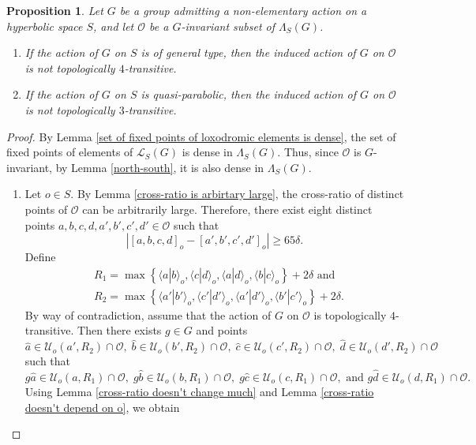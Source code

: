 \documentclass[11pt,letterpaper]{article}
\renewcommand{\l}{\langle}
\renewcommand{\r}{\rangle}
\newtheorem{prop}[thm]{Proposition}
\theoremstyle{definition}
\theoremstyle{remark}
\begin{document}
\begin{prop}\label{not 4-transitivity}
 Let $G$ be a group admitting a non-elementary action on a hyperbolic space $S$, and let $\mathcal{O}$ be a $G$-invariant subset of $\Lambda_S(G)$.
\begin{enumerate}
    \item[(a)] If the action of $G$ on $S$ is of general type, then the induced action of $G$ on $\mathcal{O}$ is not topologically $4$-transitive.
    \item[(b)] If the action of $G$ on $S$ is quasi-parabolic, then the induced action of $G$ on $\mathcal{O}$ is not topologically $3$-transitive.
\end{enumerate}
\end{prop}

\begin{proof}
 By Lemma \ref{set of fixed points of loxodromic elements is dense}, the set of fixed points of elements of $\mathcal{L}_S(G)$ is dense in $\Lambda_S(G)$. Thus, since $\mathcal{O}$ is $G$-invariant, by Lemma \ref{north-south}, it is also dense in $\Lambda_S(G)$.
\begin{enumerate}
\item[(a)]
Let $o \in S$. By Lemma \ref{cross-ratio is arbirtary large}, the cross-ratio of distinct points of $\mathcal{O}$ can be arbitrarily large. Therefore, there exist eight distinct points $a, b, c, d, a', b', c', d' \in \mathcal{O}$ such that 
$$\left|[a, b, c, d]_o - [a', b', c', d']_o\right| \geq 65\delta.$$
Define
$$
\begin{aligned}
&R_1=\max\left\{\l a|b\r_o, \l c|d\r_o, \l a|d\r_o, \l b|c\r_o \right\}+2\delta \text{ and }\\
& R_2=\max\left\{\l a'|b'\r_o, \l c'|d'\r_o, \l a'|d'\r_o, \l b'|c'\r_o \right\}+2\delta.
\end{aligned}
$$ 
By way of contradiction, assume that the action of $G$ on $\mathcal{O}$ is topologically $4$-transitive. Then there exists $g \in G$ and points 
$$\widehat{a} \in  \mathcal U_o(a', R_2) \cap \mathcal{O}, \;  \widehat{b} \in  \mathcal U_o(b', R_2) \cap \mathcal{O}, \;  \widehat{c} \in  \mathcal U_o(c', R_2) \cap \mathcal{O}, \;  \widehat{d} \in  \mathcal U_o(d', R_2) \cap \mathcal{O}$$
such that 
$$g\widehat{a} \in \mathcal U_o(a, R_1) \cap \mathcal{O}, \; g\widehat{b} \in \mathcal U_o(b, R_1) \cap \mathcal{O}, \;  g\widehat{c} \in \mathcal U_o(c, R_1) \cap \mathcal{O}, \text{ and } g\widehat{d} \in \mathcal U_o(d, R_1) \cap \mathcal{O}.$$
Using Lemma \ref{cross-ratio doesn't change much} and Lemma \ref{cross-ratio doesn't depend on o}, we obtain

\end{enumerate}
\end{proof}
\end{document}
